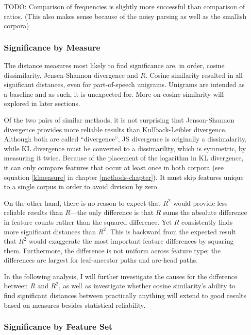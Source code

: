 TODO: Comparison of frequencies is slightly more successful than
  comparison of ratios. (This also makes sense because of the noisy
  parsing as well as the smallish corpora)

\subsubsection{Significance by Measure}

The distance measures most likely to find significance are, in order,
cosine dissimilarity, Jensen-Shannon divergence and $R$. Cosine
similarity resulted in all significant distances, even for
part-of-speech unigrams. Unigrams are intended as a baseline and as
such, it is unexpected for. More on cosine similarity will explored
in later sections.

Of the two pairs of similar methods, it is not surprising that
Jenson-Shannon divergence provides more reliable results than
Kullback-Leibler divergence. Although both are called ``divergence'',
JS divergence is originally a dissimalarity, while KL divergence must
be converted to a dissimarility, which is symmetric, by measuring it
twice. Because of the placement of the logarithm in KL divergence, it
can only compare features that occur at least once in both corpora (see equation
\ref{klmeasure} in chapter \ref{methods-chapter}). It must skip
features unique to a single corpus in order to avoid division by zero.

On the other hand, there is no reason to expect that $R^2$ would
provide less reliable results than $R$---the only difference is that
$R$ sums the absolute difference in feature counts rather than the
squared difference. Yet $R$ consistently finds more significant
distances than $R^2$. This is backward from the expected result that
$R^2$ would exaggerate the most important feature differences by
squaring them. Furthermore, the difference is not uniform across feature
type; the differences are largest for leaf-ancestor paths and
arc-head paths.

In the following analysis, I will further investigate the causes for the difference
between $R$ and $R^2$, as well as investigate whether cosine
similarity's ability to find significant distances between practically
anything will extend to good results based on measures besides
statistical reliability.

\subsubsection{Significance by Feature Set}

